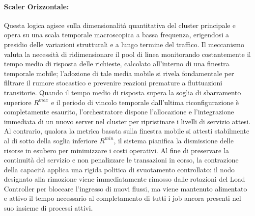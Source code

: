 ﻿\documentclass[a4paper,12pt]{article}
\begin{document}
\paragraph{Scaler Orizzontale:}
Questa logica agisce sulla dimensionalità quantitativa del cluster principale e opera su una scala temporale macroscopica a bassa frequenza, erigendosi a presidio delle variazioni strutturali e a lungo termine del traffico. Il meccanismo valuta la necessità di ridimensionare il pool di linea monitorando costantemente il tempo medio di risposta delle richieste, calcolato all'interno di una finestra temporale mobile; l'adozione di tale media mobile si rivela fondamentale per filtrare il rumore stocastico e prevenire reazioni premature a fluttuazioni transitorie. Quando il tempo medio di risposta supera la soglia di sbarramento superiore $R^{max}$ e il periodo di vincolo temporale dall'ultima riconfigurazione è completamente esaurito, l'orchestratore dispone l'allocazione e l'integrazione immediata di un nuovo server nel cluster per ripristinare i livelli di servizio attesi. Al contrario, qualora la metrica basata sulla finestra mobile si attesti stabilmente al di sotto della soglia inferiore $R^{min}$, il sistema pianifica la dismissione delle risorse in esubero per minimizzare i costi operativi. Al fine di preservare la continuità del servizio e non penalizzare le transazioni in corso, la contrazione della capacità applica una rigida politica di svuotamento controllato: il nodo designato alla rimozione viene immediatamente rimosso dalle rotazioni del Load Controller per bloccare l'ingresso di nuovi flussi, ma viene mantenuto alimentato e attivo il tempo necessario al completamento di tutti i job ancora presenti nel suo insieme di processi attivi.
\end{document}
